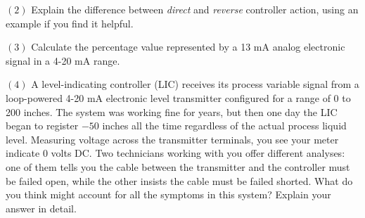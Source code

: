 \vskip 20pt

\item{$(2)$} Explain the difference between {\it direct} and {\it reverse} controller action, using an example if you find it helpful.

\vskip 20pt

\item{$(3)$} Calculate the percentage value represented by a 13 mA analog electronic signal in a 4-20 mA range.

\vskip 20pt

\item{$(4)$} A level-indicating controller (LIC) receives its process variable signal from a loop-powered 4-20 mA electronic level transmitter configured for a range of 0 to 200 inches.  The system was working fine for years, but then one day the LIC began to register $-50$ inches all the time regardless of the actual process liquid level.  Measuring voltage across the transmitter terminals, you see your meter indicate 0 volts DC.  Two technicians working with you offer different analyses: one of them tells you the cable between the transmitter and the controller must be failed open, while the other insists the cable must be failed shorted.  What do you think might account for all the symptoms in this system?  Explain your answer in detail.







